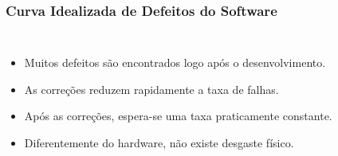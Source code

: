 \documentclass[9pt]{beamer}
\begin{document}
    \begin{frame}
    \frametitle{Curva Idealizada de Defeitos do Software}
    
    \begin{columns}
    
    
    \begin{itemize}
    
    \item Muitos defeitos são encontrados logo após o desenvolvimento.
    
    \item As correções reduzem rapidamente a taxa de falhas.
    
    \item Após as correções, espera-se uma taxa praticamente constante.
    
    \item Diferentemente do hardware, não existe desgaste físico.
    
    \end{itemize}
    
    
    \centering
    
    
    \end{columns}
    
    \end{frame}
    
\end{document}
